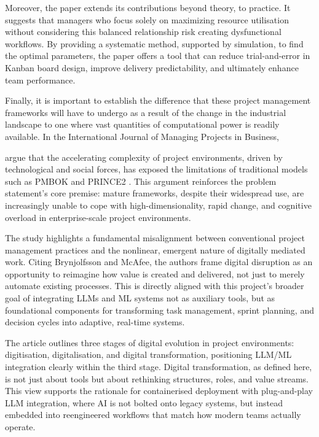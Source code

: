 \documentclass{report}
\begin{document}
Moreover, the paper extends its contributions beyond theory, to practice. It suggests that managers who focus solely on maximizing resource utilisation without considering this balanced relationship risk creating dysfunctional workflows. By providing a systematic method, supported by simulation, to find the optimal parameters, the paper offers a tool that can reduce trial-and-error in Kanban board design, improve delivery predictability, and ultimately enhance team performance.

Finally, it is important to establish the difference that these project management frameworks will have to undergo as a result of the change in the industrial landscape to one where vast quantities of computational power is readily available. In the International Journal of Managing Projects in Business, \author{sonta-draczkowskaChallengesScalingAgile2024} argue that the accelerating complexity of project environments, driven by technological and social forces, has exposed the limitations of traditional models such as PMBOK and PRINCE2 \parencite{sonta-draczkowskaChallengesScalingAgile2024}. This argument reinforces the problem statement's core premise: mature frameworks, despite their widespread use, are increasingly unable to cope with high-dimensionality, rapid change, and cognitive overload in enterprise-scale project environments.

The study highlights a fundamental misalignment between conventional project management practices and the nonlinear, emergent nature of digitally mediated work. Citing Brynjolfsson and McAfee, the authors frame digital disruption as an opportunity to reimagine how value is created and delivered, not just to merely automate existing processes. This is directly aligned with this project's broader goal of integrating LLMs and ML systems not as auxiliary tools, but as foundational components for transforming task management, sprint planning, and decision cycles into adaptive, real-time systems.

The article outlines three stages of digital evolution in project environments: digitisation, digitalisation, and digital transformation, positioning LLM/ML integration clearly within the third stage. Digital transformation, as defined here, is not just about tools but about rethinking structures, roles, and value streams. This view supports the rationale for containerised deployment with plug-and-play LLM integration, where AI is not bolted onto legacy systems, but instead embedded into reengineered workflows that match how modern teams actually operate.
\end{document}
